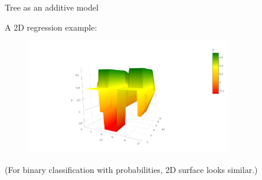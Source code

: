 \documentclass[11pt,compress,t,notes=noshow, xcolor=table]{beamer}
\begin{document}
\begin{vbframe}{Tree as an additive model}

A 2D regression example: 
\lz
\begin{figure} 
\includegraphics[width=0.8\textwidth, keepaspectratio]{figure_man/tree-contin-surface3d.png}
\end{figure}


(For binary classification with probabilities, 2D surface looks similar.)

\end{vbframe}










\endlecture
\end{document}
